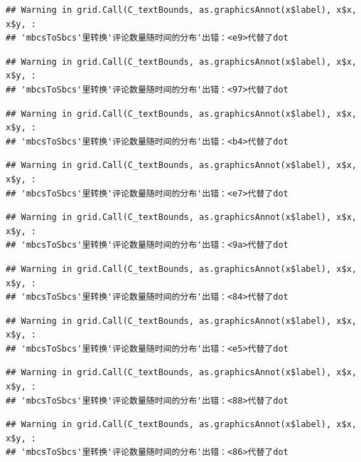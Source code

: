 \documentclass[
]{article}
\begin{document}
\begin{verbatim}
## Warning in grid.Call(C_textBounds, as.graphicsAnnot(x$label), x$x, x$y, :
## 'mbcsToSbcs'里转换'评论数量随时间的分布'出错：<e9>代替了dot
\end{verbatim}

\begin{verbatim}
## Warning in grid.Call(C_textBounds, as.graphicsAnnot(x$label), x$x, x$y, :
## 'mbcsToSbcs'里转换'评论数量随时间的分布'出错：<97>代替了dot
\end{verbatim}

\begin{verbatim}
## Warning in grid.Call(C_textBounds, as.graphicsAnnot(x$label), x$x, x$y, :
## 'mbcsToSbcs'里转换'评论数量随时间的分布'出错：<b4>代替了dot
\end{verbatim}

\begin{verbatim}
## Warning in grid.Call(C_textBounds, as.graphicsAnnot(x$label), x$x, x$y, :
## 'mbcsToSbcs'里转换'评论数量随时间的分布'出错：<e7>代替了dot
\end{verbatim}

\begin{verbatim}
## Warning in grid.Call(C_textBounds, as.graphicsAnnot(x$label), x$x, x$y, :
## 'mbcsToSbcs'里转换'评论数量随时间的分布'出错：<9a>代替了dot
\end{verbatim}

\begin{verbatim}
## Warning in grid.Call(C_textBounds, as.graphicsAnnot(x$label), x$x, x$y, :
## 'mbcsToSbcs'里转换'评论数量随时间的分布'出错：<84>代替了dot
\end{verbatim}

\begin{verbatim}
## Warning in grid.Call(C_textBounds, as.graphicsAnnot(x$label), x$x, x$y, :
## 'mbcsToSbcs'里转换'评论数量随时间的分布'出错：<e5>代替了dot
\end{verbatim}

\begin{verbatim}
## Warning in grid.Call(C_textBounds, as.graphicsAnnot(x$label), x$x, x$y, :
## 'mbcsToSbcs'里转换'评论数量随时间的分布'出错：<88>代替了dot
\end{verbatim}

\begin{verbatim}
## Warning in grid.Call(C_textBounds, as.graphicsAnnot(x$label), x$x, x$y, :
## 'mbcsToSbcs'里转换'评论数量随时间的分布'出错：<86>代替了dot
\end{verbatim}
\end{document}
